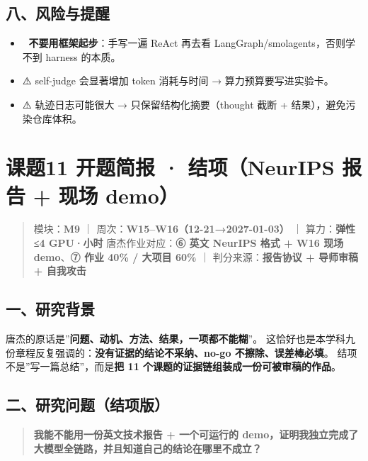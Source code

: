\documentclass[
  chinese,
  11pt,
]{ctexart}
\providecommand{\tightlist}{%
  \setlength{\itemsep}{0pt}\setlength{\parskip}{0pt}}
\begin{document}
\subsection{八、风险与提醒}\label{ux516bux98ceux9669ux4e0eux63d0ux9192-8}

\begin{itemize}
\tightlist
\item
  🚨 \textbf{不要用框架起步}：手写一遍 ReAct 再去看 LangGraph/smolagents，否则学不到 harness 的本质。
\item
  ⚠️ self-judge 会显著增加 token 消耗与时间 → 算力预算要写进实验卡。
\item
  ⚠️ 轨迹日志可能很大 → 只保留结构化摘要（thought 截断 + 结果），避免污染仓库体积。
\end{itemize}

\newpage

\section{课题11 开题简报 · 结项（NeurIPS 报告 + 现场 demo）}\label{ux8bfeux989811-ux5f00ux9898ux7b80ux62a5-ux7ed3ux9879neurips-ux62a5ux544a-ux73b0ux573a-demo}

\begin{quote}
模块：\textbf{M9} ｜ 周次：\textbf{W15--W16（12-21→2027-01-03）} ｜ 算力：\textbf{弹性 ≤4 GPU·小时} 唐杰作业对应：\textbf{⑥ 英文 NeurIPS 格式 + W16 现场 demo}、\textbf{⑦ 作业 40\% / 大项目 60\%} ｜ 判分来源：\textbf{报告协议 + 导师审稿 + 自我攻击}
\end{quote}

\subsection{一、研究背景}\label{ux4e00ux7814ux7a76ux80ccux666f-9}

唐杰的原话是''\textbf{问题、动机、方法、结果，一项都不能糊}''。 这恰好也是本学科九份章程反复强调的：\textbf{没有证据的结论不采纳、no-go 不擦除、误差棒必填}。 结项不是''写一篇总结''，而是\textbf{把 11 个课题的证据链组装成一份可被审稿的作品}。

\subsection{二、研究问题（结项版）}\label{ux4e8cux7814ux7a76ux95eeux9898ux7ed3ux9879ux7248}

\begin{quote}
\textbf{我能不能用一份英文技术报告 + 一个可运行的 demo，证明我独立完成了大模型全链路，并且知道自己的结论在哪里不成立？}
\end{quote}
\end{document}
